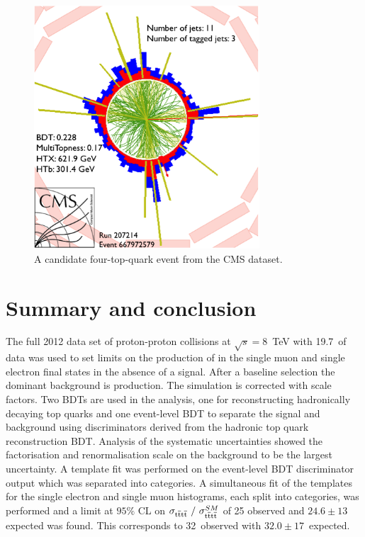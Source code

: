 \begin{figure}[ht!]
\centering
    \includegraphics[width=0.75\textwidth]{images/Run1/EventDisplay4topsDraft}
    \caption{A candidate four-top-quark event from the  CMS dataset.}
    \label{fig:fourtopevent}
\end{figure}
\section{Summary and conclusion}
\label{sec:summary8}
The full 2012 data set of proton-proton collisions at $\sqrt{s}=8$~TeV with 19.7~\fbinv of data was used to set limits on the production of \tttt in the single muon and single electron final states in the absence of a signal. After a baseline selection the dominant background is \ttbar production. The simulation is corrected with scale factors. Two BDTs are used in the analysis, one for reconstructing hadronically decaying top quarks and one event-level BDT to separate the signal and background using discriminators derived from the hadronic top quark reconstruction BDT. Analysis of the systematic uncertainties showed the factorisation and renormalisation scale on the \ttbar background to be the largest uncertainty. A template fit was performed on the event-level BDT discriminator output which was separated into \njets categories. A simultaneous fit of the templates for the single electron and single muon histograms, each split into \njets categories, was performed and a \CLS limit at $95\%$ CL on $\sigma_{{\mathrm{t}\overline{\mathrm{t}}\mathrm{t}\overline{\mathrm{t}}}}~/~\sigma_{{\mathrm{t}\overline{\mathrm{t}}\mathrm{t}\overline{\mathrm{t}}}}^{SM} $ of 25 observed and $24.6\pm13$ expected was found. This corresponds to 32~\fb observed with $32.0\pm17$~\fb expected.

